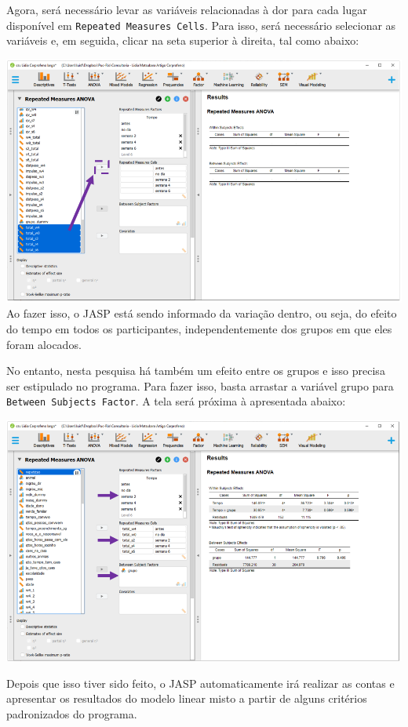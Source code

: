 \documentclass[
]{book}
\begin{document}
Agora, será necessário levar as variáveis relacionadas à dor para cada lugar disponível em \texttt{Repeated\ Measures\ Cells}. Para isso, será necessário selecionar as variáveis e, em seguida, clicar na seta superior à direita, tal como abaixo:

\includegraphics{./img/cap_anovarm_within.png}
Ao fazer isso, o JASP está sendo informado da variação dentro, ou seja, do efeito do tempo em todos os participantes, independentemente dos grupos em que eles foram alocados.

No entanto, nesta pesquisa há também um efeito entre os grupos e isso precisa ser estipulado no programa. Para fazer isso, basta arrastar a variável grupo para \texttt{Between\ Subjects\ Factor}. A tela será próxima à apresentada abaixo:

\includegraphics{./img/cap_anovarm_resultados.png}

Depois que isso tiver sido feito, o JASP automaticamente irá realizar as contas e apresentar os resultados do modelo linear misto a partir de alguns critérios padronizados do programa.
\end{document}
